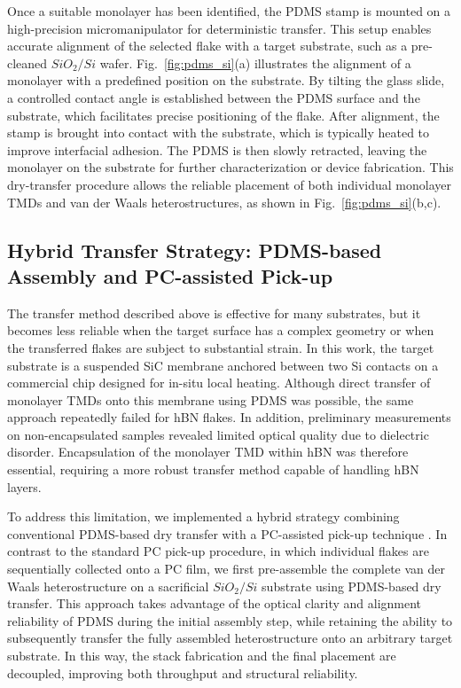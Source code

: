 Once a suitable monolayer has been identified, the PDMS stamp is mounted on a high-precision micromanipulator for deterministic transfer. This setup enables accurate alignment of the selected flake with a target substrate, such as a pre-cleaned $SiO_2/Si$ wafer. Fig.~\ref{fig:pdms_si}(a) illustrates the alignment of a monolayer with a predefined position on the substrate. By tilting the glass slide, a controlled contact angle is established between the PDMS surface and the substrate, which facilitates precise positioning of the flake. After alignment, the stamp is brought into contact with the substrate, which is typically heated to improve interfacial adhesion. The PDMS is then slowly retracted, leaving the monolayer on the substrate for further characterization or device fabrication. This dry-transfer procedure allows the reliable placement of both individual monolayer TMDs and van der Waals heterostructures, as shown in Fig.~\ref{fig:pdms_si}(b,c).


\subsection{Hybrid Transfer Strategy: PDMS-based Assembly and PC-assisted Pick-up}
\label{sub:chapKeyWord__subsection_1_2}

The transfer method described above is effective for many substrates, but it becomes less reliable when the target surface has a complex geometry or when the transferred flakes are subject to substantial strain. In this work, the target substrate is a suspended SiC membrane anchored between two Si contacts on a commercial chip designed for in-situ local heating. Although direct transfer of monolayer TMDs onto this membrane using PDMS was possible, the same approach repeatedly failed for hBN flakes. In addition, preliminary measurements on non-encapsulated samples revealed limited optical quality due to dielectric disorder. Encapsulation of the monolayer TMD within hBN was therefore essential, requiring a more robust transfer method capable of handling hBN layers.

To address this limitation, we implemented a hybrid strategy combining conventional PDMS-based dry transfer with a PC-assisted pick-up technique \cite{purdie-2018,zomer-2014}. In contrast to the standard PC pick-up procedure, in which individual flakes are sequentially collected onto a PC film, we first pre-assemble the complete van der Waals heterostructure on a sacrificial $SiO_2/Si$ substrate using PDMS-based dry transfer. This approach takes advantage of the optical clarity and alignment reliability of PDMS during the initial assembly step, while retaining the ability to subsequently transfer the fully assembled heterostructure onto an arbitrary target substrate. In this way, the stack fabrication and the final placement are decoupled, improving both throughput and structural reliability.

